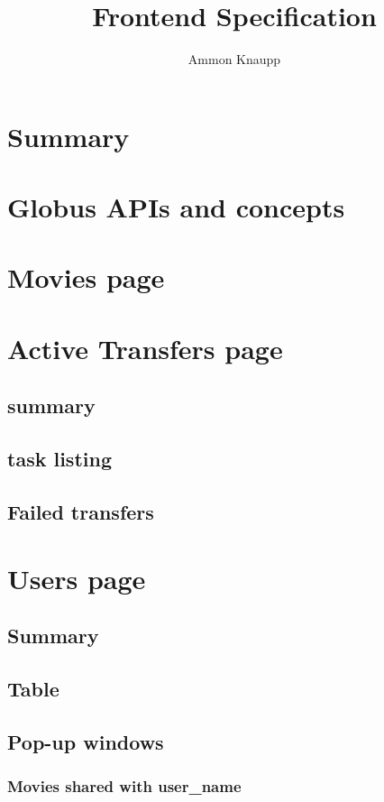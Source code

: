 \documentclass{report}
\author{Ammon Knaupp}
\title{Frontend Specification}
\begin{document}
\maketitle
\tableofcontents

\chapter{Summary}


\chapter{Globus APIs and concepts}


\chapter{Movies page}


\chapter{Active Transfers page}
\section{summary}
\section{task listing}
\section{Failed transfers}

\chapter{Users page}
\section{Summary}
\section{Table}
\section{Pop-up windows}
\subsection{Movies shared with user\_name}
\end{document}
